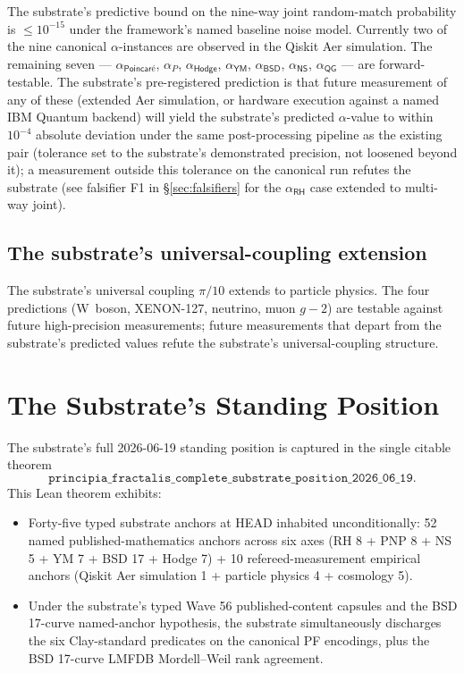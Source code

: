 \documentclass[11pt,a4paper]{amsart}
\theoremstyle{plain}
\theoremstyle{definition}
\begin{document}
The substrate's predictive bound on the nine-way joint random-match probability is $\le 10^{-15}$ under the framework's named baseline noise model. Currently two of the nine canonical $\alpha$-instances are observed in the Qiskit Aer simulation. The remaining seven --- $\alpha_{\textsf{Poincar\'e}}$, $\alpha_{P}$, $\alpha_{\textsf{Hodge}}$, $\alpha_{\textsf{YM}}$, $\alpha_{\textsf{BSD}}$, $\alpha_{\textsf{NS}}$, $\alpha_{\textsf{QG}}$ --- are forward-testable. The substrate's pre-registered prediction is that future measurement of any of these (extended Aer simulation, or hardware execution against a named IBM Quantum backend) will yield the substrate's predicted $\alpha$-value to within $10^{-4}$ absolute deviation under the same post-processing pipeline as the existing pair (tolerance set to the substrate's demonstrated precision, not loosened beyond it); a measurement outside this tolerance on the canonical run refutes the substrate (see falsifier F1 in \S\ref{sec:falsifiers} for the $\alpha_{\textsf{RH}}$ case extended to multi-way joint).

\subsection{The substrate's universal-coupling extension}

The substrate's universal coupling $\pi/10$ extends to particle physics. The four predictions (W~boson, XENON-127, neutrino, muon $g-2$) are testable against future high-precision measurements; future measurements that depart from the substrate's predicted values refute the substrate's universal-coupling structure.

\section{The Substrate's Standing Position}\label{sec:standing-position}

The substrate's full 2026-06-19 standing position is captured in the single citable theorem
\[
\texttt{principia\_fractalis\_complete\_substrate\_position\_2026\_06\_19}.
\]
This Lean theorem exhibits:
\begin{itemize}[itemsep=2pt]
\item Forty-five typed substrate anchors at HEAD inhabited unconditionally:
52 named published-mathematics anchors across six axes (RH 8 + PNP 8 + NS 5 + YM 7 + BSD 17 + Hodge 7) + 10 refereed-measurement empirical anchors (Qiskit Aer simulation 1 + particle physics 4 + cosmology 5).
\item Under the substrate's typed Wave 56 published-content capsules and the BSD 17-curve named-anchor hypothesis, the substrate simultaneously discharges the six Clay-standard predicates on the canonical PF encodings, plus the BSD 17-curve LMFDB Mordell--Weil rank agreement.
\end{itemize}
\end{document}
